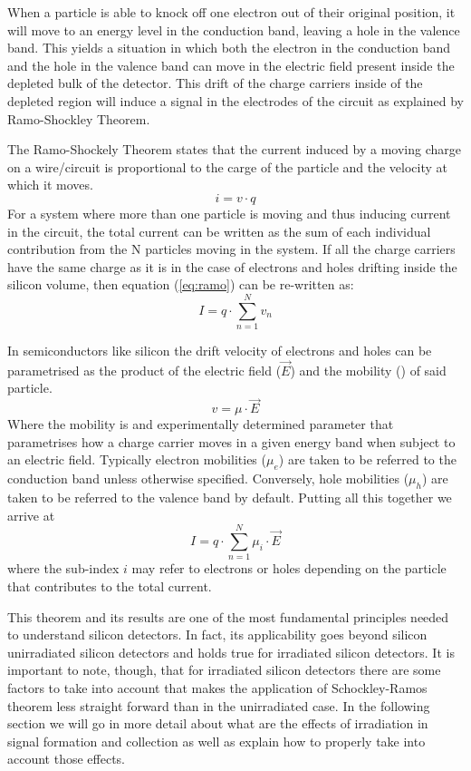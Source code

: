 When a particle is able to knock off one electron out of their original position, it will move to an energy level in the conduction band, leaving a hole in the valence band. This yields a situation in which both the electron in the conduction band and the hole in the valence band can move in the electric field present inside the depleted bulk of the detector. This drift of the charge carriers inside of the depleted region will induce a signal in the electrodes of the circuit as explained by Ramo-Shockley Theorem.

The Ramo-Shockely Theorem states that the current induced by a moving charge on a wire/circuit is proportional to the carge of the particle and the velocity at which it moves. 
\begin{equation}
	i = v \cdot q
	\label{eq:ramo} 
\end{equation} 
For a system where more than one particle is moving and thus inducing current in the circuit, the total current can be written as the sum of each individual contribution from the N particles moving in the system. If all the charge carriers have the same charge as it is in the case of electrons and holes drifting inside the silicon volume, then equation (\ref{eq:ramo}) can be re-written as:
\begin{equation}
	I = q \cdot \sum_{n=1}^{N} v_n 	\label{eq:ramoTot} 
\end{equation} 

In semiconductors like silicon the drift velocity of electrons and holes can be parametrised as the product of the electric field ($ \vec E $) and the mobility (\mu) of said particle.\[v = \mu \cdot \vec E\] Where the mobility is and experimentally determined parameter that parametrises how a charge carrier moves in a given energy band when subject to an electric field. Typically electron mobilities ($ \mu_e $) are taken to be referred to the conduction band unless otherwise specified. Conversely, hole mobilities ($ \mu_h $) are taken to be referred to the valence band by default. Putting all this together we arrive at
\begin{equation}
	I = q \cdot \sum_{n=1}^{N} \mu_i \cdot \vec{E} 
\label{eq:ramoMob}
\end{equation}
where the sub-index $i$ may refer to electrons or holes depending on the particle that contributes to the total current.

This theorem and its results are one of the most fundamental principles needed to understand silicon detectors. In fact, its applicability goes beyond silicon unirradiated silicon detectors and holds true for irradiated silicon detectors. It is important to note, though, that for irradiated silicon detectors there are some factors to take into account that makes the application of Schockley-Ramos theorem less straight forward than in the unirradiated case. In the following section we will go in more detail about what are the effects of irradiation in signal formation and collection as well as explain how to properly take into account those effects.
